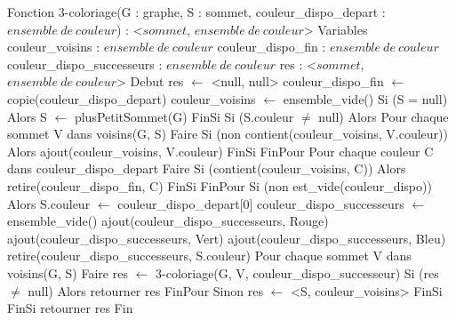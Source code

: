 \begin{algorithm}[caption={3-coloriage}] \label{alg:3color}
    Fonction 3-coloriage(G : graphe, S : sommet,
        couleur_dispo_depart : $ensemble\ de\ couleur$) : <$sommet$, $ensemble\ de\ couleur$>
    Variables
        couleur_voisins : $ensemble\ de\ couleur$
        couleur_dispo_fin : $ensemble\ de\ couleur$
        couleur_dispo_successeurs : $ensemble\ de\ couleur$
        res : <$sommet$, $ensemble\ de\ couleur$>
    Debut
        res $\gets$ <null, null>
        couleur_dispo_fin $\gets$ copie(couleur_dispo_depart)
        couleur_voisins $\gets$ ensemble_vide()
        Si (S = null) Alors
            S $\gets$ plusPetitSommet(G)
        FinSi
        Si (S.couleur $\ne$ null) Alors
            Pour chaque sommet V dans voisins(G, S) Faire
                Si (non contient(couleur_voisins, V.couleur)) Alors
                    ajout(couleur_voisins, V.couleur)
                FinSi
            FinPour
            Pour chaque couleur C dans couleur_dispo_depart Faire
                Si (contient(couleur_voisins, C)) Alors
                    retire(couleur_dispo_fin, C)
                FinSi
            FinPour
            Si (non est_vide(couleur_dispo)) Alors
                S.couleur $\gets$ couleur_dispo_depart[0]
                couleur_dispo_successeurs $\gets$ ensemble_vide()
                ajout(couleur_dispo_successeurs, Rouge)
                ajout(couleur_dispo_successeurs, Vert)
                ajout(couleur_dispo_successeurs, Bleu)
                retire(couleur_dispo_successeurs, S.couleur)
                Pour chaque sommet V dans voisins(G, S) Faire
                    res $\gets$ 3-coloriage(G, V, couleur_dispo_successeur)
                    Si (res $\ne$ null) Alors
                        retourner res
                FinPour
            Sinon
                res $\gets$ <S, couleur_voisins>
            FinSi
        FinSi
        retourner res
    Fin
\end{algorithm}